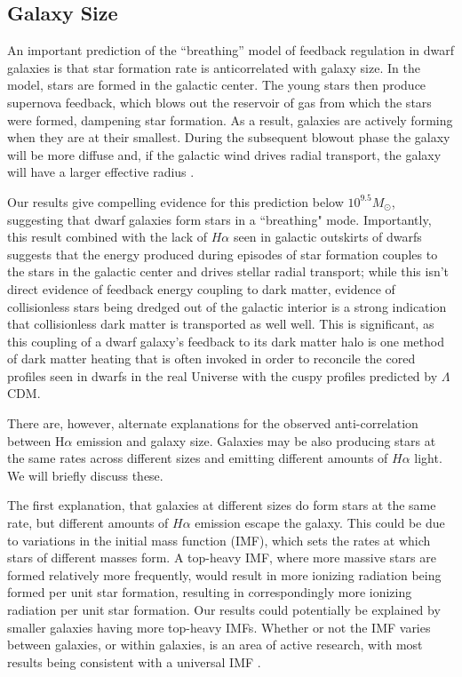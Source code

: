 \documentclass[iop]{emulateapj}
\begin{document}
\subsection{Galaxy Size}

An important prediction of the ``breathing'' model of feedback regulation in dwarf galaxies is that star formation rate is anticorrelated with galaxy size. In the model, stars are formed in the galactic center. The young stars then produce supernova feedback, which blows out the reservoir of gas from which the stars were formed, dampening star formation. As a result, galaxies are actively forming when they are at their smallest. During the subsequent blowout phase the galaxy will be more diffuse and, if the galactic wind drives radial transport, the galaxy will have a larger effective radius \cite{EB17}. 

Our results give compelling evidence for this prediction below $10^{9.5} M_{\odot}$, suggesting that dwarf galaxies form stars in a ``breathing" mode. Importantly, this result combined with the lack of $H\alpha$ seen in galactic outskirts of dwarfs suggests that the energy produced during episodes of star formation couples to the stars in the galactic center and drives stellar radial transport;  while this isn't direct evidence of feedback energy coupling to dark matter, evidence of collisionless stars being dredged out of the galactic interior is a strong indication that collisionless dark matter is transported as well well. This is significant, as this coupling of a dwarf galaxy's feedback to its dark matter halo is one method of dark matter heating that is often invoked in order to reconcile the cored profiles seen in dwarfs in the real Universe with the cuspy profiles predicted by $\Lambda$CDM. 

There are, however, alternate explanations for the observed anti-correlation between H$\alpha$ emission and galaxy size. Galaxies may be also producing stars at the same rates across different sizes and emitting different amounts of $H\alpha$ light. We will briefly discuss these.

The first explanation, that galaxies at different sizes do form stars at the same rate, but different amounts of $H\alpha$ emission escape the galaxy. This could be due to variations in the initial mass function (IMF), which sets the rates at which stars of different masses form. A top-heavy IMF, where more massive stars are formed relatively more frequently, would result in more ionizing radiation being formed per unit star formation, resulting in correspondingly more ionizing radiation per unit star formation. Our results could potentially be explained by smaller galaxies having more top-heavy IMFs. Whether or not the IMF varies between galaxies, or within galaxies, is an area of active research, with most results being consistent with a universal IMF \citep[e.g.,][]{Bastian10}. 
\end{document}
